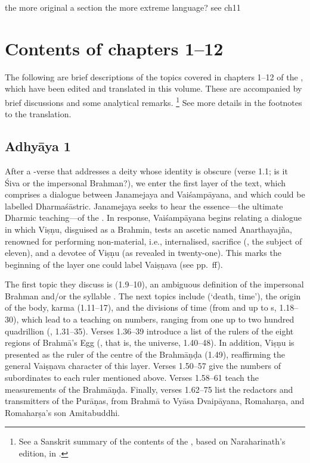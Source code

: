 \CHECK the more original a section the more extreme language? see ch11


\vfill
\pagebreak

\section{Contents of chapters 1--12}\label{contentsof1_12}

The following are brief descriptions of the topics covered in chapters 
1--12 of the \VSS, which have been edited and translated in this volume. 
These are accompanied by brief discussions and some analytical remarks.%
		\footnote{See a Sanskrit summary of the 
					contents of the \VSS, based on Naraharinath's edition,
					in . }
See more details in the footnotes to the translation.
					
\subsection{Adhyāya 1}\label{contents_of_ch01}
After a -verse that addresses a 
deity whose identity is obscure (verse 1.1; is it Śiva or the 
impersonal Brahman?), we enter the first layer 
of the text, which comprises a dialogue between Janamejaya and 
Vaiśampāyana, and which could be labelled Dharmaśāstric.
Janamejaya seeks to hear the essence---the ultimate Dharmic 
teaching---of the \MBh. In response, Vaiśampāyana begins relating 
a dialogue in which Viṣṇu, disguised as a Brahmin, 
tests an ascetic named Anarthayajña, renowned for performing 
non-material, i.e., internalised, sacrifice (, 
the subject of  eleven), and 
a devotee of Viṣṇu (as revealed in  twenty-one). 
This marks the beginning of the layer one could label Vaiṣṇava (see pp.~\pageref{structure}ff). 

The first topic they discuss is  (1.9--10), an
ambiguous definition of the impersonal Brahman and/or the syllable . 
The next topics include  (`death, time'), the origin of the body, karma (1.11--17), 
and the divisions of time (from  and  up to s, 1.18--30), 
which lead to a teaching on numbers, ranging from one up to 
two hundred quadrillion (, 1.31--35).
Verses 1.36--39 introduce a list of the rulers of the eight 
regions of Brahmā's Egg (, that is, the universe, 1.40--48). 
In addition, Viṣṇu is presented as the ruler of the centre of the Brahmāṇḍa (1.49),  
reaffirming the general Vaiṣṇava character of this layer. 
Verses 1.50--57 give the numbers of subordinates to each ruler mentioned above. 
Verses 1.58--61 teach the measurements of the Brahmāṇḍa. 
Finally, verses 1.62--75 list the redactors and transmitters of the Purāṇas, 
from Brahmā to Vyāsa Dvaipāyana, Romaharṣa, and Romaharṣa's son Amitabuddhi.


